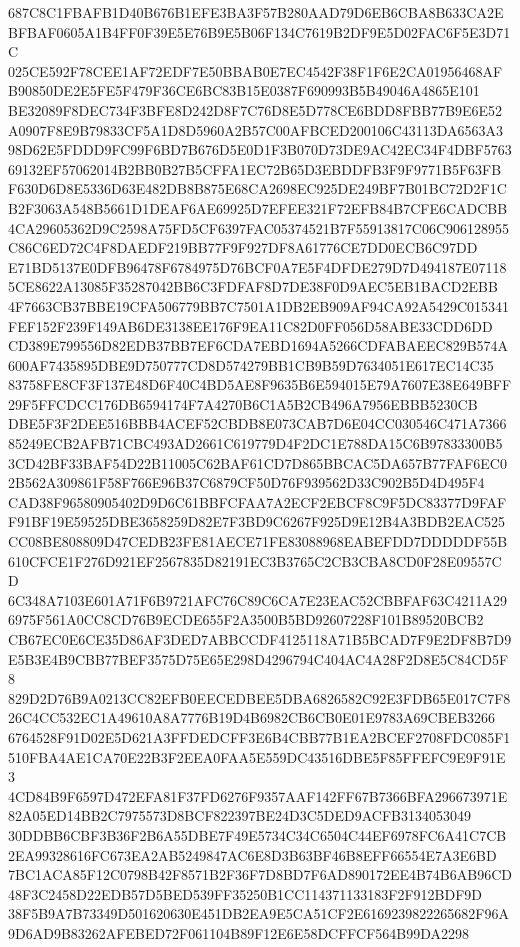 \documentclass[UTF8,fontset=fandol,zihao=-4,a4paper]{ctexart}
\begin{document}
{{687C8C1FBAFB1D40B676B1EFE3BA3F57B280AAD79D6EB6CBA8B633CA2EBFBAF0605A1B4FF0F39E5E76B9E5B06F134C7619B2DF9E5D02FAC6F5E3D71C
025CE592F78CEE1AF72EDF7E50BBAB0E7EC4542F38F1F6E2CA01956468AFB90850DE2E5FE5F479F36CE6BC83B15E0387F690993B5B49046A4865E101
BE32089F8DEC734F3BFE8D242D8F7C76D8E5D778CE6BDD8FBB77B9E6E52A0907F8E9B79833CF5A1D8D5960A2B57C00AFBCED200106C43113DA6563A3
98D62E5FDDD9FC99F6BD7B676D5E0D1F3B070D73DE9AC42EC34F4DBF576369132EF57062014B2BB0B27B5CFFA1EC72B65D3EBDDFB3F9F9771B5F63FB
F630D6D8E5336D63E482DB8B875E68CA2698EC925DE249BF7B01BC72D2F1CB2F3063A548B5661D1DEAF6AE69925D7EFEE321F72EFB84B7CFE6CADCBB
4CA29605362D9C2598A75FD5CF6397FAC05374521B7F55913817C06C906128955C86C6ED72C4F8DAEDF219BB77F9F927DF8A61776CE7DD0ECB6C97DD
E71BD5137E0DFB96478F6784975D76BCF0A7E5F4DFDE279D7D494187E071185CE8622A13085F35287042BB6C3FDFAF8D7DE38F0D9AEC5EB1BACD2EBB
4F7663CB37BBE19CFA506779BB7C7501A1DB2EB909AF94CA92A5429C015341FEF152F239F149AB6DE3138EE176F9EA11C82D0FF056D58ABE33CDD6DD
CD389E799556D82EDB37BB7EF6CDA7EBD1694A5266CDFABAEEC829B574A600AF7435895DBE9D750777CD8D574279BB1CB9B59D7634051E617EC14C35
83758FE8CF3F137E48D6F40C4BD5AE8F9635B6E594015E79A7607E38E649BFF29F5FFCDCC176DB6594174F7A4270B6C1A5B2CB496A7956EBBB5230CB
DBE5F3F2DEE516BBB4ACEF52CBDB8E073CAB7D6E04CC030546C471A736685249ECB2AFB71CBC493AD2661C619779D4F2DC1E788DA15C6B97833300B5
3CD42BF33BAF54D22B11005C62BAF61CD7D865BBCAC5DA657B77FAF6EC02B562A309861F58F766E96B37C6879CF50D76F939562D33C902B5D4D495F4
CAD38F96580905402D9D6C61BBFCFAA7A2ECF2EBCF8C9F5DC83377D9FAFF91BF19E59525DBE3658259D82E7F3BD9C6267F925D9E12B4A3BDB2EAC525
CC08BE808809D47CEDB23FE81AECE71FE83088968EABEFDD7DDDDDF55B610CFCE1F276D921EF2567835D82191EC3B3765C2CB3CBA8CD0F28E09557CD
6C348A7103E601A71F6B9721AFC76C89C6CA7E23EAC52CBBFAF63C4211A296975F561A0CC8CD76B9ECDE655F2A3500B5BD92607228F101B89520BCB2
CB67EC0E6CE35D86AF3DED7ABBCCDF4125118A71B5BCAD7F9E2DF8B7D9E5B3E4B9CBB77BEF3575D75E65E298D4296794C404AC4A28F2D8E5C84CD5F8
829D2D76B9A0213CC82EFB0EECEDBEE5DBA6826582C92E3FDB65E017C7F826C4CC532EC1A49610A8A7776B19D4B6982CB6CB0E01E9783A69CBEB3266
6764528F91D02E5D621A3FFDEDCFF3E6B4CBB77B1EA2BCEF2708FDC085F1510FBA4AE1CA70E22B3F2EEA0FAA5E559DC43516DBE5F85FFEFC9E9F91E3
4CD84B9F6597D472EFA81F37FD6276F9357AAF142FF67B7366BFA296673971E82A05ED14BB2C7975573D8BCF822397BE24D3C5DED9ACFB3134053049
30DDBB6CBF3B36F2B6A55DBE7F49E5734C34C6504C44EF6978FC6A41C7CB2EA99328616FC673EA2AB5249847AC6E8D3B63BF46B8EFF66554E7A3E6BD
7BC1ACA85F12C0798B42F8571B2F36F7D8BD7F6AD890172EE4B74B6AB96CD48F3C2458D22EDB57D5BED539FF35250B1CC114371133183F2F912BDF9D
38F5B9A7B73349D501620630E451DB2EA9E5CA51CF2E6169239822265682F96A9D6AD9B83262AFEBED72F061104B89F12E6E58DCFFCF564B99DA2298
}}
\end{document}
